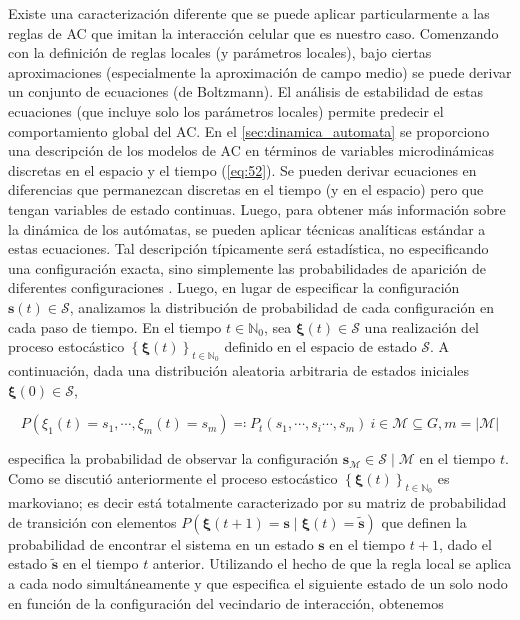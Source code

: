 Existe  una caracterización diferente que se puede aplicar particularmente a las reglas de AC que imitan la interacción celular que es nuestro caso. Comenzando con la definición de reglas locales (y parámetros locales), bajo ciertas aproximaciones (especialmente la aproximación de campo medio) se puede derivar un conjunto de ecuaciones (de Boltzmann). El análisis de estabilidad de estas ecuaciones (que incluye solo los parámetros locales) permite predecir el comportamiento global del AC. En el \cref{sec:dinamica_automata} se proporciono una descripción de los modelos de AC en términos de variables microdinámicas discretas en el espacio y el tiempo (\cref{eq:52}). Se pueden derivar ecuaciones en diferencias que permanezcan discretas en el tiempo (y en el espacio) pero que tengan variables de estado continuas. Luego, para obtener más información sobre la dinámica de los autómatas, se pueden aplicar técnicas analíticas estándar a estas ecuaciones. Tal descripción típicamente será estadística, no especificando una configuración exacta, sino simplemente las probabilidades de aparición de diferentes configuraciones \cite{deutsch_cellular_2017}. Luego, en lugar de especificar la configuración $\mathbf{s}(t) \in \mathcal{S}$, analizamos la distribución de probabilidad de cada configuración en cada paso de tiempo. En el tiempo  $t \in \mathbb{N}_0$, sea $\bm{\xi}(t) \in \mathcal{S}$ una realización del proceso estocástico $\left\{\bm{\xi}(t)\right\}_{t\in\mathbb{N}_0}$ definido en el espacio de estado $\mathcal{S}$. A continuación, dada una distribución aleatoria arbitraria de estados iniciales $\bm{\xi}(0) \in \mathcal{S}$,

\begin{equation}\label{eq:63}
	P(\xi_1(t)=s_1,\cdots,\xi_m(t)=s_m)  \eqqcolon  P_t(s_1,\cdots,s_i\cdots,s_m) \ i \in \mathcal{M}\subseteq G, m=\left| \mathcal{M}\right| 
\end{equation}

especifica la probabilidad de observar la configuración $\mathbf{s}_\mathcal{M} \in  \mathcal{S} \mid \mathcal{M}$ en el tiempo $t$.  Como se discutió anteriormente  el proceso estocástico $\left\{\bm{\xi}(t)\right\}_{t\in\mathbb{N}_0}$ es markoviano; es decir está totalmente caracterizado por su matriz de probabilidad de transición con elementos $P(\bm{\xi}(t+1)=\mathbf{s} \mid \bm{\xi}(t)=\tilde{\mathbf{s}})$ que definen la probabilidad de encontrar el sistema en un estado $\mathbf{s}$ en el tiempo $t + 1$, dado el estado $\tilde{\mathbf{s}}$  en el tiempo $t$ anterior.  Utilizando el hecho de que la regla  local   se aplica a cada nodo simultáneamente y que especifica el siguiente estado de un solo nodo en función de la configuración del vecindario de interacción, obtenemos

